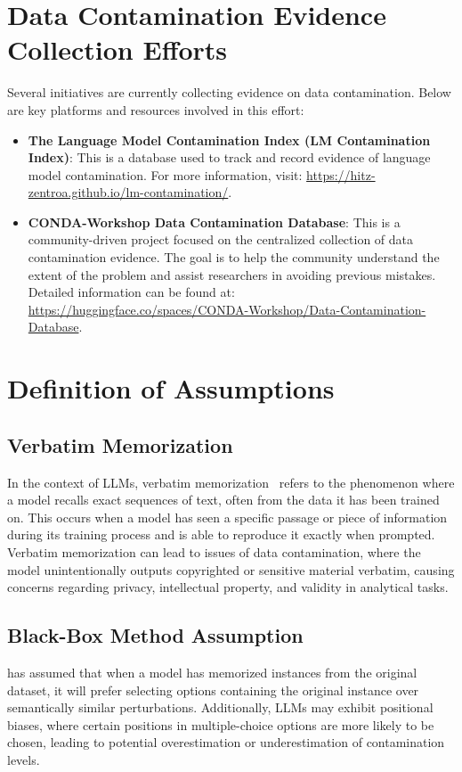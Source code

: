 \section{Data Contamination Evidence Collection Efforts}
\label{sec:Evidence Collection}
Several initiatives are currently collecting evidence on data contamination. Below are key platforms and resources involved in this effort:

\begin{itemize}
    \item \textbf{The Language Model Contamination Index (LM Contamination Index)}:  
    This is a database used to track and record evidence of language model contamination. For more information, visit: \url{https://hitz-zentroa.github.io/lm-contamination/}.
    
    \item \textbf{CONDA-Workshop Data Contamination Database}:  
    This is a community-driven project focused on the centralized collection of data contamination evidence. The goal is to help the community understand the extent of the problem and assist researchers in avoiding previous mistakes. Detailed information can be found at: \url{https://huggingface.co/spaces/CONDA-Workshop/Data-Contamination-Database}.
\end{itemize}

\section{Definition of Assumptions}
\label{sec:definition of assumptions}
\subsection{Verbatim Memorization}
\label{sec:verbatim memorization}
In the context of LLMs, verbatim memorization~\cite{carlini2021extracting,carlini2022quantifying} refers to the phenomenon where a model recalls exact sequences of text, often from the data it has been trained on. This occurs when a model has seen a specific passage or piece of information during its training process and is able to reproduce it exactly when prompted. Verbatim memorization can lead to issues of data contamination, where the model unintentionally outputs copyrighted or sensitive material verbatim, causing concerns regarding privacy, intellectual property, and validity in analytical tasks. 

\subsection{Black-Box Method Assumption}
\label{sec:assumption detail}
\citet{golchin2023data} has assumed that when a model has memorized instances from the original dataset, it will prefer selecting options containing the original instance over semantically similar perturbations. Additionally, LLMs may exhibit positional biases, where certain positions in multiple-choice options are more likely to be chosen, leading to potential overestimation or underestimation of contamination levels.

